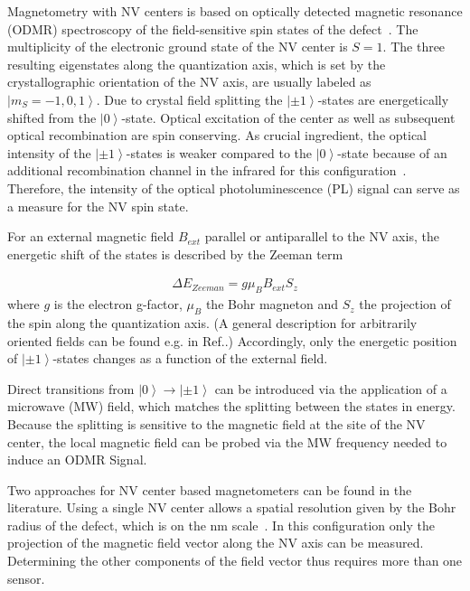 \documentclass[
 reprint,
 amsmath,
 amssymb,
aps,
 prb,
showpacs
]{revtex4-1}
\newcommand{\ket}[1]{\left \vert #1 \right \rangle}
\begin{document}
Magnetometry with NV centers is based on optically detected magnetic resonance (ODMR) spectroscopy of the field-sensitive spin states of the defect~\cite{JoPODMR, 0034-4885-77-5-056503}. The multiplicity of the electronic ground state of the NV center is $S=1$. The three resulting eigenstates along the quantization axis, which is set by the crystallographic orientation of the NV axis, are usually labeled as $\ket{m_S = -1,0,1}$. Due to crystal field splitting the $\ket{\pm 1}$-states are energetically shifted from the $\ket{0}$-state. Optical excitation of the center as well as subsequent optical recombination are spin conserving. As crucial ingredient, the optical intensity of the $\ket{\pm 1}$-states is weaker compared to the $\ket{0}$-state because of an additional recombination channel in the infrared for this configuration~\cite{APLinfrared}. Therefore, the intensity of the optical photoluminescence (PL) signal can serve as a measure for the NV spin state.

For an external magnetic field $B_{ext}$ parallel or antiparallel to the NV axis, the energetic shift of the states is described by the Zeeman term

\begin{align}
\Delta E_{Zeeman} =g \mu_B B_{ext} S_z
\label{eq:zeeman}
\end{align}
%
where $g$ is the electron g-factor, $\mu_B$ the Bohr magneton and $S_z$ the projection of the spin along the quantization axis. (A general description for arbitrarily oriented fields can be found e.g. in Ref.\cite{Balasubramanian2008}.) Accordingly, only the energetic position of $\ket{\pm 1}$-states changes as a function of the external field. 

Direct transitions from $\ket{0} \rightarrow \ket{\pm 1}$ can be introduced via the application of a microwave (MW) field, which matches the splitting between the states in energy. Because the splitting is sensitive to the magnetic field at the site of the NV center, the local magnetic field can be probed via the MW frequency needed to induce an ODMR Signal.  

Two approaches for NV center based magnetometers can be found in the literature. Using a single NV center allows a spatial resolution given by the Bohr radius of the defect, which is on the nm scale~\cite{MaletinskyP.2012, Rondin2013, Grinolds2013, HaeberleT.2015, Luan2015}. In this configuration only the projection of the magnetic field vector along the NV axis can be measured. Determining the other components of the field vector thus requires more than one sensor.
\end{document}
